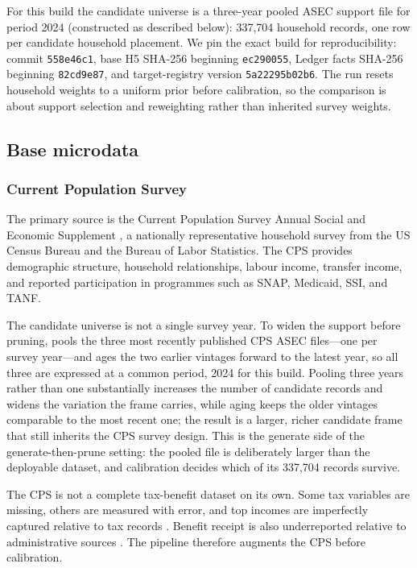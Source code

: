 For this build the candidate universe is a three-year pooled ASEC support file for period 2024
(constructed as described below): 337{,}704 household records, one row per candidate household placement.
We pin the exact build for
reproducibility: \populace{} commit \texttt{558e46c1}, base H5 SHA-256 beginning
\texttt{ec290055}, Ledger facts SHA-256 beginning \texttt{82cd9e87}, and target-registry version
\texttt{5a22295b02b6}. The run resets household weights to a uniform prior before calibration, so the
comparison is about support selection and reweighting rather than inherited survey weights.

\subsection{Base microdata}

\subsubsection{Current Population Survey}

The primary source is the Current Population Survey Annual Social and Economic Supplement
\citep[CPS ASEC;][]{census2024}, a nationally representative household survey from the US Census
Bureau and the Bureau of Labor Statistics. The CPS provides demographic structure, household
relationships, labour income, transfer income, and reported participation in programmes such as
SNAP, Medicaid, SSI, and TANF.

The candidate universe is not a single survey year. To widen the support before pruning, \populace{}
pools the three most recently published CPS ASEC files---one per survey year---and ages the two earlier
vintages forward to the latest year, so all three are expressed at a common period, 2024 for this build.
Pooling three years rather than one substantially increases the number of candidate records and widens the
variation the frame carries, while aging keeps the older vintages comparable to the most recent one; the result is a
larger, richer candidate frame that still inherits the CPS survey design. This is the generate side of the
generate-then-prune setting: the pooled file is deliberately larger than the deployable dataset, and
calibration decides which of its 337{,}704 records survive.

The CPS is not a complete tax-benefit dataset on its own. Some tax variables are missing, others are
measured with error, and top incomes are imperfectly captured relative to tax records
\citep{burkhauser2012}. Benefit receipt is also underreported relative to administrative sources
\citep{meyer2015}. The pipeline therefore augments the CPS before calibration.

